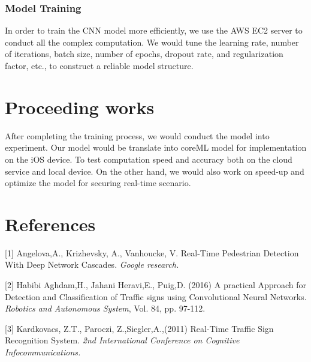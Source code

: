 \documentclass{article}
\begin{document}
\subsubsection{Model Training}
In order to train the CNN model more efficiently, we use the AWS EC2 server to conduct all the complex computation. We would tune the learning rate, number of iterations, batch size, number of epochs, dropout rate, and regularization factor, etc., to construct a reliable model structure.

\section{Proceeding works}
After completing the training process, we would conduct the model into experiment. Our model would be translate into coreML model for implementation on the iOS device. To test computation speed and accuracy both on the cloud service and local device. On the other hand, we would also work on speed-up and optimize the model for securing real-time scenario.


\section*{References}

\medskip

\small

[1] Angelova,A., Krizhevsky, A., Vanhoucke, V. Real-Time Pedestrian Detection With Deep Network Cascades. {\it Google research.}

[2] Habibi Aghdam,H., Jahani Heravi,E., Puig,D. (2016) A practical Approach for Detection and Classification of Traffic signs using Convolutional Neural Networks. {\it Robotics and Autonomous System}, Vol. 84, pp. 97-112.

[3] Kardkovacs, Z.T., Paroczi, Z.,Siegler,A.,(2011) Real-Time Traffic Sign Recognition System. {\it 2nd International Conference on Cognitive Infocommunications.}
\end{document}
